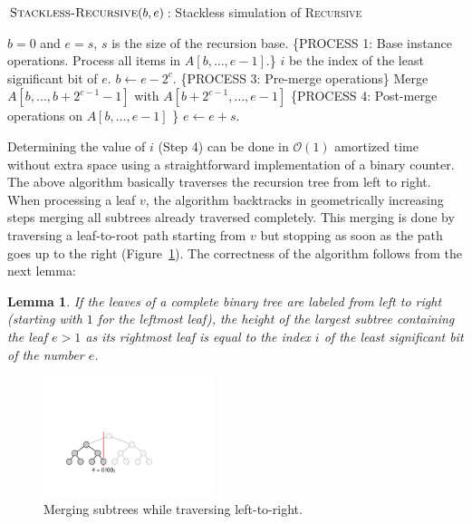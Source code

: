 \documentclass{elsart}
\newcommand{\Oh}[1]{\ensuremath{\mathcal{O}(#1)}}
\newtheorem{lemma}{Lemma}
\begin{document}
{\begin{algorithm}
  \caption{$\textsc{Stackless-Recursive}(b,e)$: Stackless simulation
of \textsc{Recursive}}
  \label{alg:traversal}
  \begin{algorithmic}[1]
    \STATE $b=0$ and $e=s$, $s$ is the size of the recursion base.
    \STATE \{PROCESS 1: Base instance operations. Process all items in
$A[b,\ldots, e-1]$.\}
    \STATE $i$ be the index of the least significant bit of $e$.
    \STATE $b \gets e-2^c$.
    \STATE \{PROCESS 3: Pre-merge operations\}
    \STATE Merge  $A[b,\ldots, b+2^{c-1} - 1]$ with
$A[b+2^{c-1},\ldots, e-1]$
    \STATE \{PROCESS 4: Post-merge operations on $A[b,\ldots, e-1]$ \}
    \ENDFOR 
    \STATE $e \gets e + s$.
    \ENDWHILE
  \end{algorithmic}
\end{algorithm}

Determining the value of $i$ (Step 4) can be done in $\Oh{1}$ amortized
time without extra space using a straightforward implementation of a
binary counter.  The above algorithm basically traverses the recursion
tree from left to right. When processing a leaf $v$, the algorithm
backtracks in geometrically increasing steps merging all subtrees
already traversed completely. This merging is done by traversing a
leaf-to-root path starting from $v$ but stopping as soon as the path
goes up to the right (Figure~\ref{fig:tree_spaceefficient}). The
correctness of the algorithm follows from the next
lemma\cite{cormen:alg}:

\begin{lemma}
  If the leaves of a complete binary tree are labeled from left to
  right (starting with $1$ for the leftmost leaf), the height of the
  largest subtree containing the leaf $e>1$ as its rightmost leaf is
  equal to the index $i$ of the least significant bit of the number
  $e$.
\end{lemma}

\begin{figure}
  \centerline{\includegraphics[height=3.5cm]{tree_spaceefficient}}
  \caption{Merging subtrees while traversing left-to-right.}
  \label{fig:tree_spaceefficient}
\end{figure}

}
\end{document}
